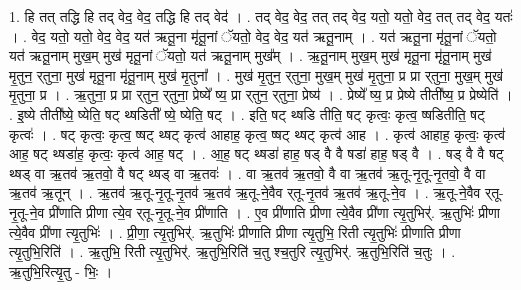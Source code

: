 \documentclass[17pt]{extarticle}
\begin{document}
1. हि तत् तद्धि हि तद् वेद॒ वेद॒ तद्धि हि तद् वेद॑ । . तद् वेद॒ वेद॒ तत् तद् वेद॒ यतो॒ यतो॒ वेद॒ तत् तद् वेद॒ यतः॑ । . वेद॒ यतो॒ यतो॒ वेद॒ वेद॒ यत॑ ऋतू॒ना मृ॑तू॒नां ॅयतो॒ वेद॒ वेद॒ यत॑ ऋतू॒नाम् । . यत॑ ऋतू॒ना मृ॑तू॒नां ॅयतो॒ यत॑ ऋतू॒नाम् मुख॒म् मुख॑ मृतू॒नां ॅयतो॒ यत॑ ऋतू॒नाम् मुख᳚म् । . ऋ॒तू॒नाम् मुख॒म् मुख॑ मृतू॒ना मृ॑तू॒नाम् मुख॑ मृ॒तुन॒ र्‌तुना॒ मुख॑ मृतू॒ना मृ॑तू॒नाम् मुख॑ मृ॒तुना᳚ । . मुख॑ मृ॒तुन॒ र्‌तुना॒ मुख॒म् मुख॑ मृ॒तुना॒ प्र प्रा र्‌तुना॒ मुख॒म् मुख॑ मृ॒तुना॒ प्र । . ऋ॒तुना॒ प्र प्रा र्‌तुन॒ र्‌तुना॒ प्रेष्ये᳚ ष्य॒ प्रा र्‌तुन॒ र्‌तुना॒ प्रेष्य॑ । . प्रेष्ये᳚ ष्य॒ प्र प्रेष्ये तीती᳚ष्य॒ प्र प्रेष्येति॑ । . इ॒ष्ये तीती᳚ष्ये॒ ष्येति॒ षट् थ्षडिती᳚ ष्ये॒ ष्येति॒ षट् । . इति॒ षट् थ्षडि तीति॒ षट् कृत्वः॒ कृत्व॒ ष्षडितीति॒ षट् कृत्वः॑ । . षट् कृत्वः॒ कृत्व॒ ष्षट् थ्षट् कृत्व॑ आहाह॒ कृत्व॒ ष्षट् थ्षट् कृत्व॑ आह । . कृत्व॑ आहाह॒ कृत्वः॒ कृत्व॑ आह॒ षट् थ्षडा॑ह॒ कृत्वः॒ कृत्व॑ आह॒ षट् । . आ॒ह॒ षट् थ्षडा॑ हाह॒ षड् वै वै षडा॑ हाह॒ षड् वै । . षड् वै वै षट् थ्षड् वा ऋ॒तव॑ ऋ॒तवो॒ वै षट् थ्षड् वा ऋ॒तवः॑ । . वा ऋ॒तव॑ ऋ॒तवो॒ वै वा ऋ॒तव॑ ऋ॒तू-नृ॒तू-नृ॒तवो॒ वै वा ऋ॒तव॑ ऋ॒तून् । . ऋ॒तव॑ ऋ॒तू-नृ॒तू-नृ॒तव॑ ऋ॒तव॑ ऋ॒तू-ने॒वैव र्‌तू-नृ॒तव॑ ऋ॒तव॑ ऋ॒तू-ने॒व । . ऋ॒तू-ने॒वैव र्‌तू-नृ॒तू-ने॒व प्री॑णाति प्रीणा त्ये॒व र्‌तू-नृ॒तू-ने॒व प्री॑णाति । . ए॒व प्री॑णाति प्रीणा त्ये॒वैव प्री॑णा त्यृ॒तुभिर्॑. ऋ॒तुभिः॑ प्रीणा त्ये॒वैव प्री॑णा त्यृ॒तुभिः॑ । . प्री॒णा॒ त्यृ॒तुभिर्॑. ऋ॒तुभिः॑ प्रीणाति प्रीणा त्यृ॒तुभि॒ रिती त्यृ॒तुभिः॑ प्रीणाति प्रीणा त्यृ॒तुभि॒रिति॑ । . ऋ॒तुभि॒ रिती त्यृ॒तुभिर्॑. ऋ॒तुभि॒रिति॑ च॒तु श्च॒तुरि त्यृ॒तुभिर्॑. ऋ॒तुभि॒रिति॑ च॒तुः । . ऋ॒तुभि॒रित्यृ॒तु - भिः॒ । \newline
\end{document}
